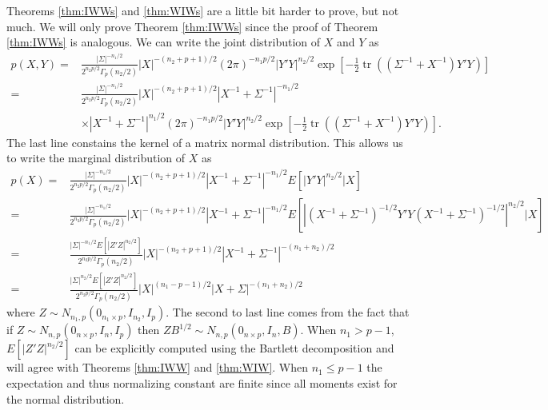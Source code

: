 \documentclass{article}\usepackage[]{graphicx}\usepackage[]{color}
\DeclareMathOperator{\tr}{tr}
\begin{document}
Theorems \eqref{thm:IWWs} and \eqref{thm:WIWs} are a little bit harder to prove, but not much. We will only prove Theorem \eqref{thm:IWWs} since the proof of Theorem \eqref{thm:IWWs} is analogous. We can write the joint distribution of $X$ and $Y$ as
\begin{align*}
  p(X,Y) =& \frac{|\Sigma|^{-n_1/2}}{2^{n_2p/2}\Gamma_p(n_2/2)}|X|^{-(n_2 + p + 1)/2}(2\pi)^{-n_1p/2}|Y'Y|^{n_2/2}\exp\left[-\frac{1}{2}\tr\left((\Sigma^{-1} + X^{-1})Y'Y\right)\right]\\
  =& \frac{|\Sigma|^{-n_1/2}}{2^{n_2p/2}\Gamma_p(n_2/2)}|X|^{-(n_2 + p + 1)/2} |X^{-1} + \Sigma^{-1}|^{-n_1/2}  \\
  & \times |X^{-1} + \Sigma^{-1}|^{n_1/2} (2\pi)^{-n_1p/2}|Y'Y|^{n_2/2}\exp\left[-\frac{1}{2}\tr\left((\Sigma^{-1} + X^{-1})Y'Y\right)\right].
\end{align*}
The last line constains the kernel of a matrix normal distribution. This allows us to write the marginal distribution of $X$ as
\begin{align*}
  p(X) = & \frac{|\Sigma|^{-n_1/2}}{2^{n_2p/2}\Gamma_p(n_2/2)}|X|^{-(n_2 + p + 1)/2} |X^{-1} + \Sigma^{-1}|^{-n_1/2}  E[|Y'Y|^{n_2/2}|X]\\
  = & \frac{|\Sigma|^{-n_1/2}}{2^{n_2p/2}\Gamma_p(n_2/2)}|X|^{-(n_2 + p + 1)/2} |X^{-1} + \Sigma^{-1}|^{-n_1/2}  E[|(X^{-1} + \Sigma^{-1})^{-1/2}Y'Y(X^{-1} + \Sigma^{-1})^{-1/2}|^{n_2/2}|X]\\
    = & \frac{|\Sigma|^{-n_1/2}E[|Z'Z|^{n_2/2}]}{2^{n_2p/2}\Gamma_p(n_2/2)}|X|^{-(n_2 + p + 1)/2}  |X^{-1} + \Sigma^{-1}|^{-(n_1 + n_2)/2}  \\
        = & \frac{|\Sigma|^{n_2/2}E[|Z'Z|^{n_2/2}]}{2^{n_2p/2}\Gamma_p(n_2/2)}|X|^{(n_1 - p - 1)/2}  |X + \Sigma|^{-(n_1 + n_2)/2}
\end{align*}
where $Z\sim N_{n_1,p}(0_{n_1\times p},I_{n_2},I_p)$. The second to last line comes from the fact that if $Z\sim N_{n,p}(0_{n\times p},I_n,I_p)$ then $ZB^{1/2}\sim N_{n,p}(0_{n\times p},I_n,B)$. When $n_1 > p - 1$, $E[|Z'Z|^{n_2/2}]$ can be explicitly computed using the Bartlett decomposition and will agree with Theorems \eqref{thm:IWW} and \eqref{thm:WIW}. When $n_1 \leq p - 1$ the expectation and thus normalizing constant are finite since all moments exist for the normal distribution. 
\end{document}
